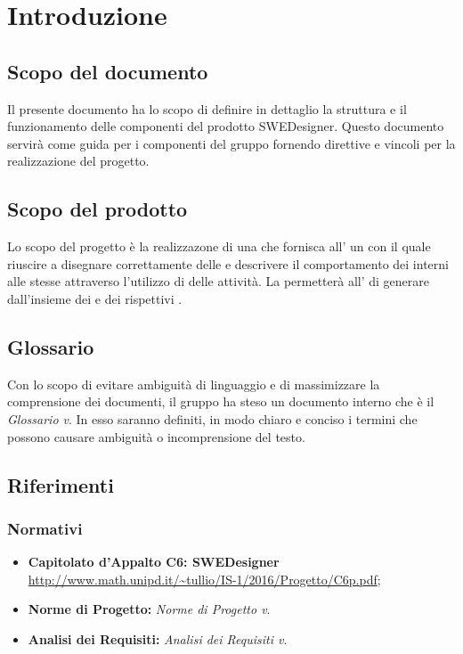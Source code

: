 \section{Introduzione}

\subsection{Scopo del documento}
Il presente documento ha lo scopo di definire in dettaglio la struttura e il funzionamento delle componenti del prodotto SWEDesigner. Questo documento servirà come guida per i componenti del gruppo fornendo direttive e vincoli per la realizzazione del progetto.

\subsection{Scopo del prodotto}
Lo scopo del progetto è la realizzazone di una  che fornisca all' un   con il quale riuscire a disegnare correttamente  delle 
          e descrivere il comportamento dei  interni alle stesse attraverso l'utilizzo di  delle attività.
          La  permetterà all' di generare   dall'insieme dei  e dei rispettivi .
\subsection{Glossario}
Con lo scopo di evitare ambiguità di linguaggio e di massimizzare la comprensione dei documenti, il gruppo ha steso un documento interno che è il \emph{Glossario v}\VersioneG{}. In esso saranno definiti, in modo chiaro e conciso i termini che possono causare ambiguità o incomprensione del testo.

\subsection{Riferimenti}
\subsubsection{Normativi}
\begin{itemize}
	\item \textbf{Capitolato d'Appalto C6: SWEDesigner} \\
		\url{http://www.math.unipd.it/~tullio/IS-1/2016/Progetto/C6p.pdf}; \\
	\item \textbf{Norme di Progetto:} \textit{Norme di Progetto v\VersioneNP}. \\
	
		\item \textbf{Analisi dei Requisiti:} \textit{Analisi dei Requisiti v\VersioneAR}. \\
\end{itemize}
